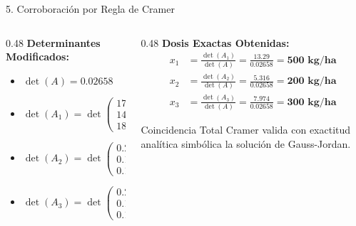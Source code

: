 \documentclass[
  spanish,
  aspectratio=169,
  xcolor={dvipsnames,table}
]{beamer}
\begin{document}
\begin{frame}{5. Corroboración por Regla de Cramer}
  \begin{columns}[T]
    \begin{column}{0.48\textwidth}
      \textbf{\color{uanlblue}Determinantes Modificados:}
      \begin{itemize}
        \item $\det(A) = 0.02658$
        \item $\det(A_1) = \det\begin{pmatrix} 175 & 0.18 & 0.13 \\ 142 & 0.46 & 0.00 \\ 182 & 0.00 & 0.44 \end{pmatrix} = \mathbf{13.29}$
        \item $\det(A_2) = \det\begin{pmatrix} 0.20 & 175 & 0.13 \\ 0.10 & 142 & 0.00 \\ 0.10 & 182 & 0.44 \end{pmatrix} = \mathbf{5.316}$
        \item $\det(A_3) = \det\begin{pmatrix} 0.20 & 0.18 & 175 \\ 0.10 & 0.46 & 142 \\ 0.10 & 0.00 & 182 \end{pmatrix} = \mathbf{7.974}$
      \end{itemize}
    \end{column}
    \begin{column}{0.48\textwidth}
      \textbf{\color{uanlblue}Dosis Exactas Obtenidas:}
      \begin{align*}
        x_1 &= \frac{\det(A_1)}{\det(A)} = \frac{13.29}{0.02658} = \mathbf{500\text{ kg/ha}} \\[0.2cm]
        x_2 &= \frac{\det(A_2)}{\det(A)} = \frac{5.316}{0.02658} = \mathbf{200\text{ kg/ha}} \\[0.2cm]
        x_3 &= \frac{\det(A_3)}{\det(A)} = \frac{7.974}{0.02658} = \mathbf{300\text{ kg/ha}}
      \end{align*}
      \begin{block}{Coincidencia Total}
        Cramer valida con exactitud analítica simbólica la solución de Gauss-Jordan.
      \end{block}
    \end{column}
  \end{columns}
\end{frame}
\end{document}

